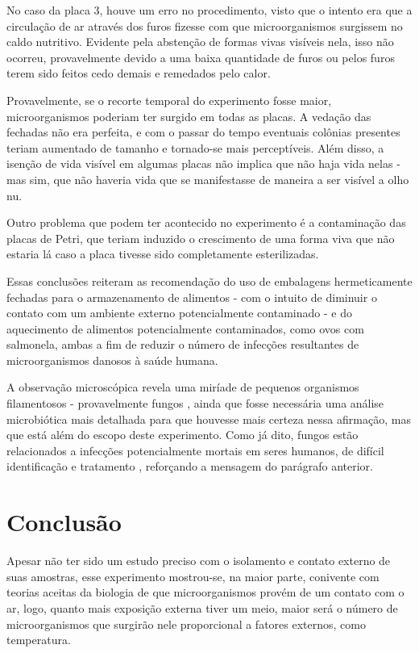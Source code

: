 \documentclass[12pt, titlepage]{article}
\begin{document}
No caso da placa 3, houve um erro no procedimento, visto que o intento era que a circulação de ar através dos furos fizesse com que microorganismos surgissem no caldo nutritivo. Evidente pela abstenção de formas vivas visíveis nela, isso não ocorreu, provavelmente devido a uma baixa quantidade de furos ou pelos furos terem sido feitos cedo demais e remedados pelo calor.

Provavelmente, se o recorte temporal do experimento fosse maior, microorganismos poderiam ter surgido em todas as placas. A vedação das fechadas não era perfeita, e com o passar do tempo eventuais colônias presentes teriam aumentado de tamanho e tornado-se mais perceptíveis. Além disso, a isenção de vida visível em algumas placas não implica que não haja vida nelas - mas sim, que não haveria vida que se manifestasse de maneira a ser visível a olho nu.

Outro problema que podem ter acontecido no experimento é a contaminação das placas de Petri, que teriam induzido o crescimento de uma forma viva que não estaria lá caso a placa tivesse sido completamente esterilizadas.

Essas conclusões reiteram as recomendação do uso de embalagens hermeticamente fechadas para o armazenamento de alimentos - com o intuito de diminuir o contato com um ambiente externo potencialmente contaminado - e do aquecimento de alimentos potencialmente contaminados, como ovos com salmonela, ambas a fim de reduzir o número de infecções resultantes de microorganismos danosos à saúde humana.

A observação microscópica revela uma miríade de pequenos organismos filamentosos - provavelmente fungos \cite{buckley2020fungal}, ainda que fosse necessária uma análise microbiótica mais detalhada para que houvesse mais certeza nessa afirmação, mas que está além do escopo deste experimento. Como já dito, fungos estão relacionados a infecções potencialmente mortais em seres humanos, de difícil identificação e tratamento \cite{Benedict2016}, reforçando a mensagem do parágrafo anterior.

\section{Conclusão}
Apesar não ter sido um estudo preciso com o isolamento e contato externo de suas amostras, esse experimento mostrou-se, na maior parte, conivente com teorias aceitas da biologia de que microorganismos provém de um contato com o ar, logo, quanto mais exposição externa tiver um meio, maior será o número de microorganismos que surgirão nele proporcional a fatores externos, como temperatura.

\printbibliography
\end{document}
